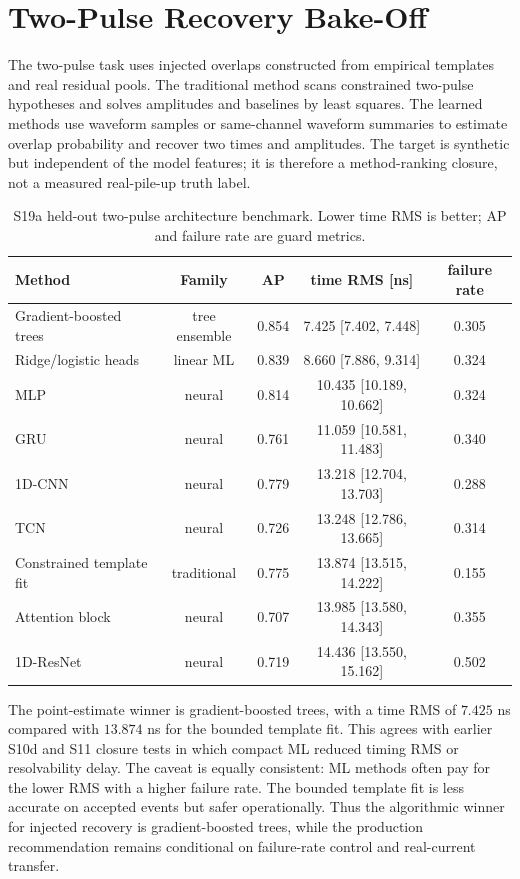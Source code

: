 \section{Two-Pulse Recovery Bake-Off}

The two-pulse task uses injected overlaps constructed from empirical templates and real residual pools. The traditional method scans constrained two-pulse hypotheses and solves amplitudes and baselines by least squares. The learned methods use waveform samples or same-channel waveform summaries to estimate overlap probability and recover two times and amplitudes. The target is synthetic but independent of the model features; it is therefore a method-ranking closure, not a measured real-pile-up truth label.

\begin{table}[H]
\centering
\caption{S19a held-out two-pulse architecture benchmark. Lower time RMS is better; AP and failure rate are guard metrics.}
\label{tab:twopulse-architecture}
\begin{tabular}{lcccc}
\toprule
Method & Family & AP & time RMS [ns] & failure rate \\
\midrule
Gradient-boosted trees & tree ensemble & 0.854 & 7.425 [7.402, 7.448] & 0.305 \\
Ridge/logistic heads & linear ML & 0.839 & 8.660 [7.886, 9.314] & 0.324 \\
MLP & neural & 0.814 & 10.435 [10.189, 10.662] & 0.324 \\
GRU & neural & 0.761 & 11.059 [10.581, 11.483] & 0.340 \\
1D-CNN & neural & 0.779 & 13.218 [12.704, 13.703] & 0.288 \\
TCN & neural & 0.726 & 13.248 [12.786, 13.665] & 0.314 \\
Constrained template fit & traditional & 0.775 & 13.874 [13.515, 14.222] & 0.155 \\
Attention block & neural & 0.707 & 13.985 [13.580, 14.343] & 0.355 \\
1D-ResNet & neural & 0.719 & 14.436 [13.550, 15.162] & 0.502 \\
\bottomrule
\end{tabular}
\end{table}

The point-estimate winner is gradient-boosted trees, with a time RMS of \(7.425\) ns compared with \(13.874\) ns for the bounded template fit. This agrees with earlier S10d and S11 closure tests in which compact ML reduced timing RMS or resolvability delay. The caveat is equally consistent: ML methods often pay for the lower RMS with a higher failure rate. The bounded template fit is less accurate on accepted events but safer operationally. Thus the algorithmic winner for injected recovery is gradient-boosted trees, while the production recommendation remains conditional on failure-rate control and real-current transfer.

